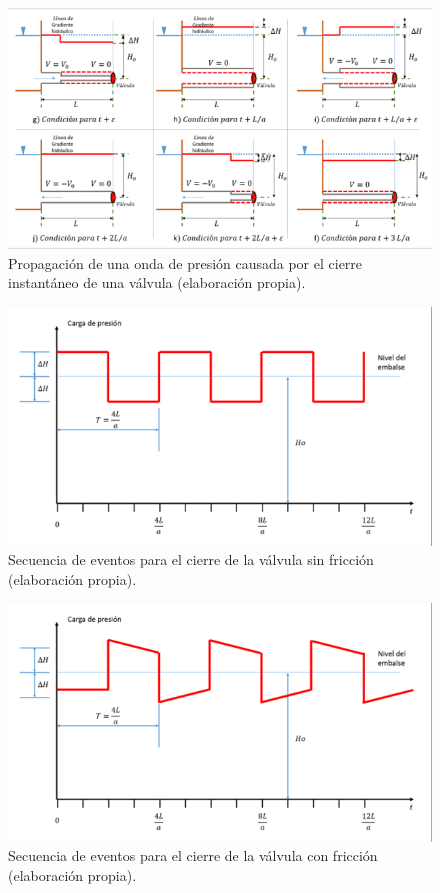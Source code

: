 \documentclass[letterpaper]{report}
\begin{document}
\begin{figure}[H]
	\centering
	\includegraphics[width=0.90\linewidth]{fig15}
	\caption{Propagación de una onda de presión causada por el cierre instantáneo de una válvula (elaboración propia).}
	\label{fig:fig15}
\end{figure}
\begin{figure}[H]
	\centering
	\includegraphics[width=0.90\linewidth]{fig16}
	\caption{Secuencia de eventos para el cierre de la válvula sin fricción (elaboración propia).}
	\label{fig:fig16}
\end{figure}
\begin{figure}[H]
	\centering
	\includegraphics[width=0.90\linewidth]{fig17}
	\caption{Secuencia de eventos para el cierre de la válvula con fricción (elaboración propia).}
	\label{fig:fig17}
\end{figure}
\clearpage
\newpage
\mbox{}
\end{document}
